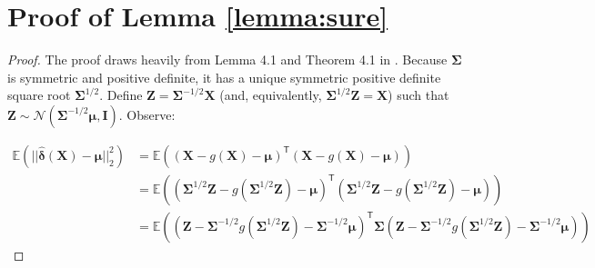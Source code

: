 \documentclass{article}
\newcommand{\bsX}{\boldsymbol X}
\newcommand{\bsZ}{\boldsymbol Z}
\newcommand{\bsmu}{\boldsymbol \mu}
\newcommand{\bsSigma}{\boldsymbol \Sigma}
\def\e{\mathbb{E}}
\newcommand{\bsdelt}{\boldsymbol{\hat \delta}}
\newcommand{\tran}{\mathsf{T}}
\begin{document}
\appendix
{}

\section{Proof of Lemma \ref{lemma:sure}}\label{sec:proofSureLemma}

\begin{proof}
The proof draws heavily from Lemma 4.1 and Theorem 4.1 in \cite{strawderman2003minimax}. Because $\bsSigma$ is symmetric and positive definite, it has a unique symmetric positive definite square root $\bsSigma^{1/2}$. Define $\bsZ = \bsSigma^{-1/2} \bsX$ (and, equivalently, $\bsSigma^{1/2}  \bsZ = \bsX$) such that $\bsZ \sim \mathcal{N} \left( \bsSigma^{-1/2}  \bsmu, \boldsymbol I \right)$. Observe:

\begin{align*}
\e \left( || \bsdelt(\bsX) - \bsmu ||_2^2 \right) &= \e \left( \left( \bsX - g(\bsX) - \bsmu \right)^\tran \left( \bsX - g(\bsX) - \bsmu \right) \right) \\
&= \e \left( \left( \bsSigma^{1/2}  \bsZ - g(\bsSigma^{1/2}  \bsZ) - \bsmu \right)^\tran \left( \bsSigma^{1/2}  \bsZ - g(\bsSigma^{1/2}  \bsZ) - \bsmu \right) \right) \\
&= \e \left( \left( \bsZ - \bsSigma^{-1/2} g(\bsSigma^{1/2}  \bsZ) - \bsSigma^{-1/2} \bsmu \right)^\tran \bsSigma \left(   \bsZ - \bsSigma^{-1/2} g(\bsSigma^{1/2}  \bsZ) - \bsSigma^{-1/2} \bsmu \right) \right) 
\end{align*}


\end{proof}
\end{document}
